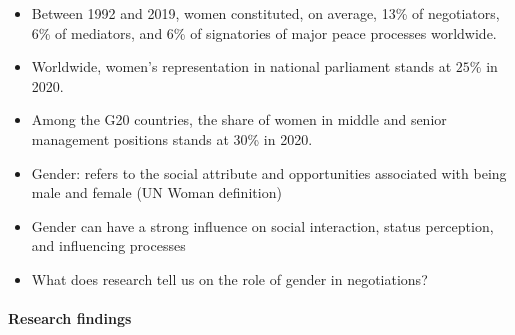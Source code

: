 \begin{itemize}
    \item Between 1992 and 2019, women constituted, on average, 13\% of negotiators,
        6\% of mediators, and 6\% of signatories of major peace processes
        worldwide.
    \item Worldwide, women's representation in national parliament stands
        at $25\%$ in 2020.
    \item Among the G20 countries, the share of women in middle and senior
        management positions stands at 30\% in 2020.
    \item Gender: refers to the social attribute and opportunities associated
        with being male and female (UN Woman definition)
    \item Gender can have a strong influence on social interaction, status
        perception, and influencing processes
    \item What does research tell us on the role of gender in negotiations?
\end{itemize}

\paragraph{Research findings}


